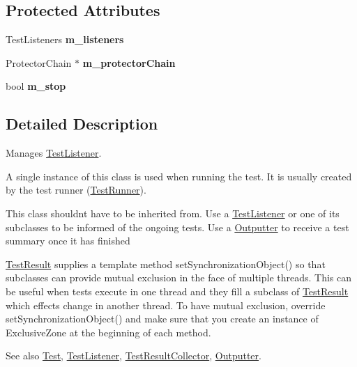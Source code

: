 \subsection*{Protected Attributes}
\begin{DoxyCompactItemize}
\item 
Test\+Listeners {\bfseries m\+\_\+listeners}\hypertarget{class_test_result_a6e5daf8393ca6cdd5a9c3b44074b037b}{}\label{class_test_result_a6e5daf8393ca6cdd5a9c3b44074b037b}

\item 
Protector\+Chain $\ast$ {\bfseries m\+\_\+protector\+Chain}\hypertarget{class_test_result_abb4a702b14af262661a9e02a0193312f}{}\label{class_test_result_abb4a702b14af262661a9e02a0193312f}

\item 
bool {\bfseries m\+\_\+stop}\hypertarget{class_test_result_ab8c04c2021b19f0c8d19bf4675f2bd86}{}\label{class_test_result_ab8c04c2021b19f0c8d19bf4675f2bd86}

\end{DoxyCompactItemize}


\subsection{Detailed Description}
Manages \hyperlink{class_test_listener}{Test\+Listener}.

A single instance of this class is used when running the test. It is usually created by the test runner (\hyperlink{class_test_runner}{Test\+Runner}). 

This class shouldn\textquotesingle{}t have to be inherited from. Use a \hyperlink{class_test_listener}{Test\+Listener} or one of its subclasses to be informed of the ongoing tests. Use a \hyperlink{class_outputter}{Outputter} to receive a test summary once it has finished

\hyperlink{class_test_result}{Test\+Result} supplies a template method \textquotesingle{}set\+Synchronization\+Object()\textquotesingle{} so that subclasses can provide mutual exclusion in the face of multiple threads. This can be useful when tests execute in one thread and they fill a subclass of \hyperlink{class_test_result}{Test\+Result} which effects change in another thread. To have mutual exclusion, override set\+Synchronization\+Object() and make sure that you create an instance of Exclusive\+Zone at the beginning of each method.

\begin{DoxySeeAlso}{See also}
\hyperlink{class_test}{Test}, \hyperlink{class_test_listener}{Test\+Listener}, \hyperlink{class_test_result_collector}{Test\+Result\+Collector}, \hyperlink{class_outputter}{Outputter}. 
\end{DoxySeeAlso}


